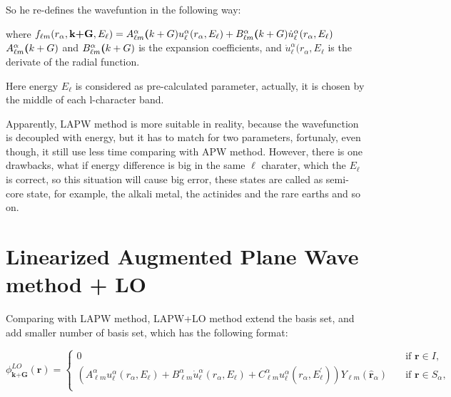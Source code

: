 \documentclass[a4paper, 12pt, titlepage,oneside,drop]{kthesis}
\begin{document}
\noindent So he re-defines the wavefuntion in the following way:

\noindent where $f_{{\ell}{m}} (r_{\alpha},\textbf{k+G} ,E_{\ell}) =  A _{{\ell}m}^{\alpha} \textbf(k+G) u_{{\ell}}^{\alpha}(r_{\alpha}, E_{\ell}) + B _{{\ell}m}^{\alpha} \textbf(k+G) \dot{u}_{{\ell}}^{\alpha}(r_{\alpha}, E_{\ell})$
$A _{{\ell}m}^{\alpha} \textbf(k+G)$ and $B _{{\ell}m}^{\alpha} \textbf(k+G)$ is the expansion coefficients, and $\dot{u}_{{\ell}}^{\alpha}(r_{\alpha}, E_{\ell}$ is the derivate of the radial function.

\noindent Here energy $E_{\ell}$  is considered as pre-calculated parameter, actually, it is chosen by the middle of  each l-character band.

\noindent Apparently, LAPW method is more suitable in reality, because the wavefunction is decoupled with energy, but it has to match for two parameters,
fortunaly, even though, it still use less time comparing with APW method. However, there is one drawbacks, what if energy difference is big in the same $ {\ell} $ charater, 
which the $E_{\ell}$ is correct, so this situation will cause big error, these states are called as semi-core state, for example, the alkali metal, the actinides and the rare earths and so on.

\section{Linearized Augmented Plane Wave method + LO}
Comparing with LAPW method, LAPW+LO method extend the basis set, and add smaller number of basis set, which has the following format:


\begin{equation*}\label{lap1}
\phi^{LO}_\textbf{k+G} (\textbf{r})= 
\begin{cases} 0 & \quad \mbox{if $\textbf{r} \in I, $}
\\
(A _{{\ell}m}^{\alpha}  u_{{\ell}}^{\alpha}(r_{\alpha}, E_{\ell}) + B _{{\ell}m}^{\alpha}  \dot{u}_{{\ell}}^{\alpha}(r_{\alpha}, E_{\ell}) + C _{{\ell}m}^{\alpha}  u_{{\ell}}^{\alpha}(r_{\alpha}, E^{\prime}_{\ell})){Y_{{\ell}m}(\hat{\textbf{r}}_{\alpha})} & \quad \mbox{if $\textbf{r} \in S_\alpha, $}\\ 
\end{cases}
\end{equation*}
 
\end{document}
